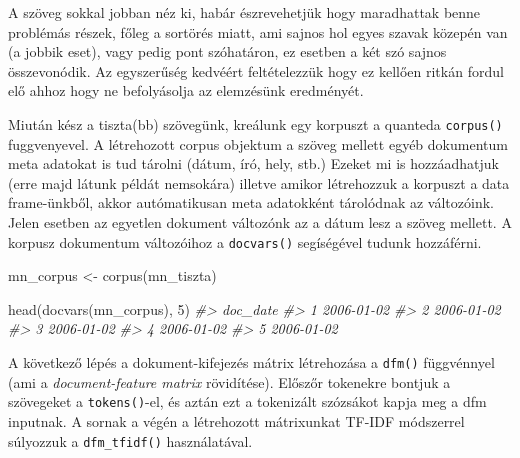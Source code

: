 \documentclass[
]{book}
\newenvironment{Shaded}{\begin{snugshade}}{\end{snugshade}}
\newcommand{\CommentTok}[1]{\textcolor[rgb]{0.56,0.35,0.01}{\textit{#1}}}
\newcommand{\DecValTok}[1]{\textcolor[rgb]{0.00,0.00,0.81}{#1}}
\newcommand{\FunctionTok}[1]{\textcolor[rgb]{0.00,0.00,0.00}{#1}}
\newcommand{\NormalTok}[1]{#1}
\newcommand{\OtherTok}[1]{\textcolor[rgb]{0.56,0.35,0.01}{#1}}
\newcommand{\SpecialCharTok}[1]{\textcolor[rgb]{0.00,0.00,0.00}{#1}}
\begin{document}
A szöveg sokkal jobban néz ki, habár észrevehetjük hogy maradhattak
benne problémás részek, főleg a sortörés miatt, ami sajnos hol egyes
szavak közepén van (a jobbik eset), vagy pedig pont szóhatáron, ez
esetben a két szó sajnos összevonódik. Az egyszerűség kedvéért
feltételezzük hogy ez kellően ritkán fordul elő ahhoz hogy ne
befolyásolja az elemzésünk eredményét.

\begin{Shaded}
\end{Shaded}

Miután kész a tiszta(bb) szövegünk, kreálunk egy korpuszt a quanteda
\texttt{corpus()} fuggvenyevel. A létrehozott corpus objektum a szöveg
mellett egyéb dokumentum meta adatokat is tud tárolni (dátum, író, hely,
stb.) Ezeket mi is hozzáadhatjuk (erre majd látunk példát nemsokára)
illetve amikor létrehozzuk a korpuszt a data frame-ünkből, akkor
autómatikusan meta adatokként tárolódnak az változóink. Jelen esetben az
egyetlen dokument változónk az a dátum lesz a szöveg mellett. A korpusz
dokumentum változóihoz a \texttt{docvars()} segíségével tudunk
hozzáférni.

\begin{Shaded}
\begin{Highlighting}[]
\NormalTok{mn\_corpus }\OtherTok{\textless{}{-}} \FunctionTok{corpus}\NormalTok{(mn\_tiszta)}

\FunctionTok{head}\NormalTok{(}\FunctionTok{docvars}\NormalTok{(mn\_corpus), }\DecValTok{5}\NormalTok{)}
\CommentTok{\#\textgreater{}     doc\_date}
\CommentTok{\#\textgreater{} 1 2006{-}01{-}02}
\CommentTok{\#\textgreater{} 2 2006{-}01{-}02}
\CommentTok{\#\textgreater{} 3 2006{-}01{-}02}
\CommentTok{\#\textgreater{} 4 2006{-}01{-}02}
\CommentTok{\#\textgreater{} 5 2006{-}01{-}02}
\end{Highlighting}
\end{Shaded}

A következő lépés a dokument-kifejezés mátrix létrehozása a
\texttt{dfm()} függvénnyel (ami a \emph{document-feature matrix}
rövidítése). Előszőr tokenekre bontjuk a szövegeket a
\texttt{tokens()}-el, és aztán ezt a tokenizált szózsákot kapja meg a
dfm inputnak. A sornak a végén a létrehozott mátrixunkat TF-IDF
módszerrel súlyozzuk a \texttt{dfm\_tfidf()} használatával.
\end{document}
